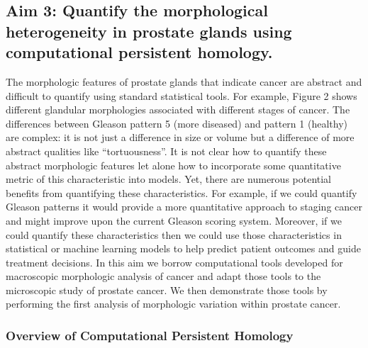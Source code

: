 \documentclass{NIHGrant}
\theoremstyle{theorem}
\begin{document}
\subsection*{Aim 3: Quantify the morphological heterogeneity in prostate glands using computational persistent homology.}
The morphologic features of prostate glands that indicate cancer are abstract and difficult to quantify using standard statistical tools. For example, Figure 2 shows different glandular morphologies associated with different stages of cancer. The differences between Gleason pattern 5 (more diseased) and pattern 1 (healthy) are complex: it is not just a difference in size or volume but a difference of more abstract qualities like ``tortuousness''. It is not clear how to quantify these abstract morphologic features let alone how to incorporate some quantitative metric of this characteristic into models. Yet, there are numerous potential benefits from quantifying these characteristics. For example, if we could quantify Gleason patterns it would provide a more quantitative approach to staging cancer and might improve upon the current Gleason scoring system. Moreover, if we could quantify these characteristics then we could use those characteristics in statistical or machine learning models to help predict patient outcomes and guide treatment decisions. In this aim we borrow computational tools developed for macroscopic morphologic analysis of cancer and adapt those tools to the microscopic study of prostate cancer. We then demonstrate those tools by performing the first analysis of morphologic variation within prostate cancer.

\subsubsection*{Overview of Computational Persistent Homology}
\end{document}

